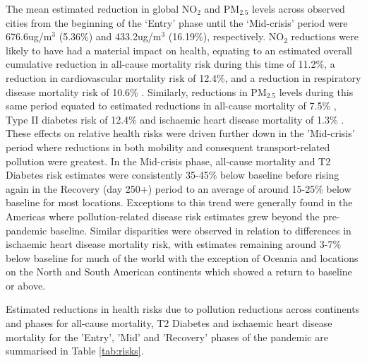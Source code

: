 \documentclass[preprint,12pt]{elsarticle}
\begin{document}
The mean estimated reduction in global NO$_{2}$ and PM$_{2.5}$ levels across observed cities from the beginning of the `Entry' phase until the `Mid-crisis' period were 676.6ug/m$^{3}$ (5.36\%) and 433.2ug/m$^{3}$ (16.19\%), respectively. NO$_{2}$ reductions were likely to have had a material impact on health, equating to an estimated overall cumulative reduction in all-cause mortality risk during this time of 11.2\%, a reduction in cardiovascular mortality risk of 12.4\%, and a reduction in respiratory disease mortality risk of 10.6\% \cite{Huang19Pollution}. Similarly, reductions in PM$_{2.5}$ levels during this same period equated to estimated reductions in all-cause mortality of 7.5\% \cite{Yu2020PM2.5}, Type II diabetes risk of 12.4\% and ischaemic heart disease mortality of 1.3\% \cite{Xie257}. These effects on relative health risks were driven further down in the 'Mid-crisis' period where reductions in both mobility and consequent transport-related pollution were greatest. In the Mid-crisis phase, all-cause mortality and T2 Diabetes risk estimates were consistently 35-45$\%$ below baseline before rising again in the Recovery (day 250+) period to an average of around 15-25$\%$ below baseline for most locations. Exceptions to this trend were generally found in the Americas where pollution-related disease risk estimates grew beyond the pre-pandemic baseline. Similar disparities were observed in relation to differences in ischaemic heart disease mortality risk, with estimates remaining around 3-7$\%$ below baseline for much of the world with the exception of Oceania and locations on the North and South American continents which showed a return to baseline or above. 


Estimated reductions in health risks due to pollution reductions across continents and phases for all-cause mortality, T2 Diabetes and ischaemic heart disease mortality for the 'Entry', 'Mid' and 'Recovery' phases of the pandemic are summarised in Table \ref{tab:risks}. 
\end{document}
